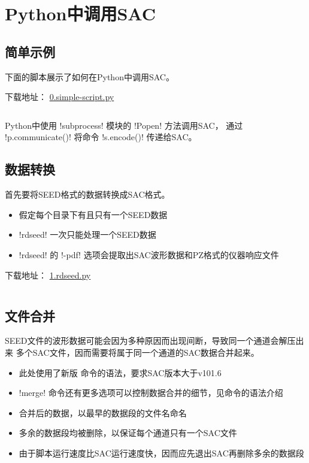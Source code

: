 \section{Python中调用SAC}
\label{sec:sac-python}

\subsection{简单示例}
下面的脚本展示了如何在Python中调用SAC。

下载地址： \href{https://raw.githubusercontent.com/seisman/SAC_Docs_zh/master/call-in-script/0.simple-script.py}{0.simple-script.py}
\inputminted{python}{./call-in-script/0.simple-script.py}
Python中使用 !subprocess! 模块的 !Popen! 方法调用SAC，
通过 !p.communicate()! 将命令 !s.encode()! 传递给SAC。

\subsection{数据转换}
首先要将SEED格式的数据转换成SAC格式。
\begin{itemize}
\item 假定每个目录下有且只有一个SEED数据
\item !rdseed! 一次只能处理一个SEED数据
\item !rdseed! 的 !-pdf! 选项会提取出SAC波形数据和PZ格式的仪器响应文件
\end{itemize}

下载地址： \href{https://raw.githubusercontent.com/seisman/SAC_Docs_zh/master/call-in-script/1.rdseed.py}{1.rdseed.py}
\inputminted{python}{./call-in-script/1.rdseed.py}

\subsection{文件合并}
\label{subsec:merge-in-python}
SEED文件的波形数据可能会因为多种原因而出现间断，导致同一个通道会解压出来
多个SAC文件，因而需要将属于同一个通道的SAC数据合并起来。
\begin{itemize}
\item 此处使用了新版  命令的语法，要求SAC版本大于v101.6
\item !merge! 命令还有更多选项可以控制数据合并的细节，见命令的语法介绍
\item 合并后的数据，以最早的数据段的文件名命名
\item 多余的数据段均被删除，以保证每个通道只有一个SAC文件
\item 由于脚本运行速度比SAC运行速度快，因而应先退出SAC再删除多余的数据段
\end{itemize}

